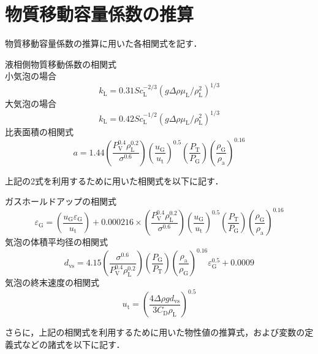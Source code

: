 \documentclass[a4j]{jsreport}
\begin{document}
\section{物質移動容量係数の推算}
物質移動容量係数の推算に用いた各相関式を記す．

液相側物質移動係数の相関式\\
小気泡の場合
\begin{equation}
    k_\mathrm{L} = 0.31Sc_\mathrm{L}^{-2/3}(g \varDelta \rho \mu_\mathrm{L}/\rho_\mathrm{L}^2)^{1/3}
\end{equation}
大気泡の場合
\begin{equation}
    k_\mathrm{L} = 0.42Sc_\mathrm{L}^{-1/2}(g \varDelta \rho \mu_\mathrm{L}/\rho_\mathrm{L}^2)^{1/3}
\end{equation}
比表面積の相関式
\begin{equation}
    a = 1.44 \left( \frac{P_\mathrm{V}^{0.4} \rho_\mathrm{L}^{0.2} }{ \sigma^{0.6}} \right) \left( \frac{u_\mathrm{G}}{u_\mathrm{t}} \right)^{0.5} \left( \frac{P_\mathrm{T}}{P_\mathrm{G}} \right) \left( \frac{\rho_\mathrm{G}}{\rho_\mathrm{a}} \right)^{0.16}
\end{equation}

上記の2式を利用するために用いた相関式を以下に記す．

ガスホールドアップの相関式
\begin{equation}
    \varepsilon_{{\mathrm G}} = \left( \frac{u_{{\mathrm G}}\varepsilon_{{\mathrm G}}}{u_{{\mathrm t}}} \right) + 0.000216 \times \left( \frac{P_\mathrm{V}^{0.4} \rho_\mathrm{L}^{0.2} }{ \sigma^{0.6}} \right) \left( \frac{u_\mathrm{G}}{u_\mathrm{t}} \right)^{0.5} \left( \frac{P_\mathrm{T}}{P_\mathrm{G}} \right) \left( \frac{\rho_\mathrm{G}}{\rho_\mathrm{a}} \right)^{0.16}
\end{equation}
気泡の体積平均径の相関式
\begin{equation}
    d_\mathrm{vs} = 4.15 \left( \frac{\sigma^{0.6}}{P_\mathrm{V}^{0.4} \rho_\mathrm{L}^{0.2}} \right) \left( \frac{P_\mathrm{G}}{P_\mathrm{T}} \right) \left( \frac{\rho_\mathrm{a}}{\rho_\mathrm{G}} \right) ^{0.16} \varepsilon_\mathrm{G}^{0.5} + 0.0009
{}\end{equation}
気泡の終末速度の相関式
\begin{equation}
    u_\mathrm{t} = \left( \frac{4\varDelta \rho g d_\mathrm{vs}}{3C_\mathrm{D} \rho_\mathrm{L}} \right)^{0.5}
\end{equation}

さらに，上記の相関式を利用するために用いた物性値の推算式，および変数の定義式などの諸式を以下に記す．
\end{document}
